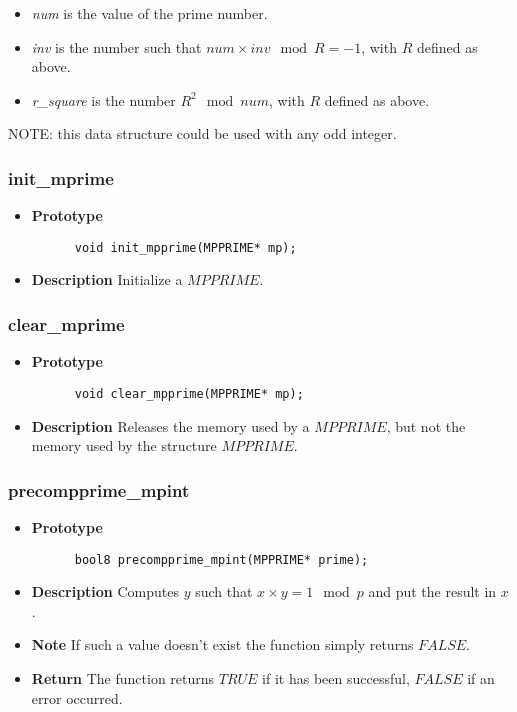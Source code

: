 \documentclass[10pt,a4paper]{article}
\begin{document}
  \begin{itemize}
    \item \textit{num} is the value of the prime number.
    \item \textit{inv} is the number such that $num \times inv \mod R = -1$, with $R$ defined as above.
    \item \textit{r\_square} is the number $R^{2} \mod num$, with $R$ defined as above.
  \end{itemize}
  
  NOTE: this data structure could be used with any odd integer.
  
  \subsubsection{init\_mprime}
  
  \begin{itemize}
    \item [] \textbf{Prototype}
    \begin{lstlisting}
      void init_mpprime(MPPRIME* mp);
    \end{lstlisting}
    \item [] \textbf{Description} Initialize a $MPPRIME$.
  \end{itemize}
  
  \subsubsection{clear\_mprime}
  
  \begin{itemize}
    \item [] \textbf{Prototype}
    \begin{lstlisting}
      void clear_mpprime(MPPRIME* mp);
    \end{lstlisting}
    \item [] \textbf{Description} Releases the memory used by a $MPPRIME$, but not the memory used by the structure $MPPRIME$.
    
  \end{itemize}
  
  \subsubsection{precompprime\_mpint}
  
  \begin{itemize}
    \item [] \textbf{Prototype}
    \begin{lstlisting}
      bool8 precompprime_mpint(MPPRIME* prime);
    \end{lstlisting}
    \item [] \textbf{Description} Computes $y$ such that $x \times y = 1 \mod p$ and put the result in $x$.
    \item [] \textbf{Note} If such a value doesn't exist the function simply returns $FALSE$.
    \item [] \textbf{Return} The function returns $TRUE$ if it has been successful, $FALSE$ if an error occurred.
  \end{itemize}
  
\end{document}
